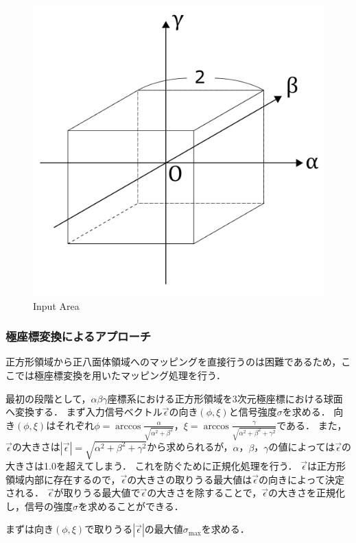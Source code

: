 \begin{figure}[h]
  \centering
  \includegraphics[width=80truemm, clip]{images/input.pdf}
  \caption{Input Area}
  \label{fig:input}
\end{figure}

\subsubsection{極座標変換によるアプローチ}

正方形領域から正八面体領域へのマッピングを直接行うのは困難であるため，ここでは極座標変換を用いたマッピング処理を行う．

最初の段階として，$\alpha\beta\gamma$座標系における正方形領域を3次元極座標における球面へ変換する．
まず入力信号ベクトル$\vec{\epsilon}$の向き$(\phi, \xi)$と信号強度$\sigma$を求める．
向き$(\phi, \xi)$はそれぞれ$\phi = \arccos{\frac{\alpha}{\sqrt{\alpha^2 + \beta^2}}}$，$\xi = \arccos{\frac{\gamma}{\sqrt{\alpha^2 + \beta^2 + \gamma^2}}}$である．
また，$\vec{\epsilon}$の大きさは$|\vec{\epsilon}| = \sqrt{\alpha^2 + \beta^2 + \gamma^2}$から求められるが，$\alpha$，$\beta$，$\gamma$の値によっては$\vec{\epsilon}$の大きさは1.0を超えてしまう．
これを防ぐために正規化処理を行う．
$\vec{\epsilon}$は正方形領域内部に存在するので，$\vec{\epsilon}$の大きさの取りうる最大値は$\vec{\epsilon}$の向きによって決定される．
$\vec{\epsilon}$が取りうる最大値で$\vec{\epsilon}$の大きさを除することで，$\vec{\epsilon}$の大きさを正規化し，信号の強度$\sigma$を求めることができる．

まずは向き$(\phi, \xi)$で取りうる$|\vec{\epsilon}|$の最大値$\sigma_{\text{max}}$を求める．